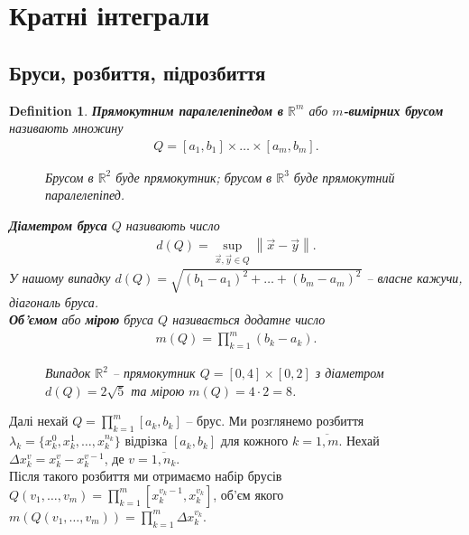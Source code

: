 \documentclass[a4paper, 10pt]{article}
\theoremstyle{theoremdd}
\theoremstyle{theoremdd}
\newtheorem{definition}[theorem]{Definition}
\theoremstyle{theoremdd}
\theoremstyle{theoremdd}
\theoremstyle{theoremdd}
\theoremstyle{theoremdd}
\theoremstyle{theoremdd}
\theoremstyle{theoremdd}
\theoremstyle{theoremdd}
\theoremstyle{theoremdd}
\theoremstyle{theoremdd}
\theoremstyle{theoremdd}
\theoremstyle{theoremdd}
\theoremstyle{theoremdd}
\theoremstyle{theoremdd}
\newcommand\Norm[1]{\left\lVert#1\right\rVert}
\begin{document}
\section{Кратні інтеграли}
\subsection{Бруси, розбиття, підрозбиття}
\begin{definition}
\textbf{Прямокутним паралелепіпедом в} $\mathbb{R}^m$ або \textbf{$m$-вимірних брусом} називають множину
\begin{align*}
Q = [a_1,b_1] \times \dots \times [a_m,b_m].
\end{align*}
\begin{figure}[H]
\centering
{}
\qquad
{}
\caption*{Брусом в $\mathbb{R}^2$ буде прямокутник; брусом в $\mathbb{R}^3$ буде прямокутний паралелепіпед.}
\end{figure}
\textbf{Діаметром бруса} $Q$ називають число
\begin{align*}
d(Q) = \sup_{\vec{x},\vec{y} \in Q} \Norm{\vec{x}-\vec{y}}.
\end{align*}
У нашому випадку $d(Q) = \sqrt{(b_1-a_1)^2 + \dots + (b_m-a_m)^2}$ -- власне кажучи, діагональ бруса.\\
\textbf{Об'ємом} або \textbf{мірою} бруса $Q$ називається додатне число
\begin{align*}
m(Q) = \prod_{k=1}^m (b_k-a_k).
\end{align*}
\begin{figure}[H]
\centering
{}
\caption*{Випадок $\mathbb{R}^2$ -- прямокутник $Q = [0,4] \times [0,2]$ з діаметром $d(Q) = 2 \sqrt{5}$ та мірою $m(Q) = 4 \cdot 2 = 8$.}
\end{figure}
\end{definition}
\noindent
Далі нехай $Q = \displaystyle\prod_{k=1}^m [a_k,b_k]$ -- брус. Ми розглянемо розбиття $\lambda_k = \{x_k^0, x_k^1,\dots,x_k^{n_k} \}$ відрізка $[a_k,b_k]$ для кожного $k = \overline{1,m}$. Нехай $\Delta x_k^v = x_k^{v} - x_k^{v-1}$, де $v = \overline{1,n_k}$.\\
Після такого розбиття ми отримаємо набір брусів $Q(v_1,\dots,v_m) = \displaystyle\prod_{k=1}^m [x_{k}^{v_k-1}, x_k^{v_k}]$, об'єм якого $m(Q(v_1,\dots,v_m)) = \displaystyle\prod_{k=1}^m \Delta x_k^{v_k}$.
\end{document}
